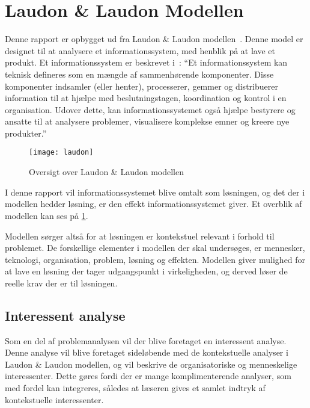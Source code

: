 \section{Laudon \& Laudon Modellen}
Denne rapport er opbygget ud fra Laudon \& Laudon modellen~\cite{laudon}. Denne model er designet til at analysere et informationssystem, med henblik på at lave et produkt. Et informationssystem er beskrevet i~\cite{laudon2006management}: \enquote{Et informationssystem kan teknisk defineres som en mængde af sammenhørende komponenter. Disse komponenter indsamler (eller henter), processerer, gemmer og distribuerer information til at hjælpe med beslutningstagen, koordination og kontrol i en organisation. Udover dette, kan informationssystemet også hjælpe bestyrere og ansatte til at analysere problemer, visualisere komplekse emner og kreere nye produkter.}

\begin{figure}
  \centering
  \texttt{[image: laudon]}
	\caption{Oversigt over Laudon \& Laudon modellen}
	\label{fig:oversigt_laudon}
\end{figure}

I denne rapport vil informationssystemet blive omtalt som løsningen, og det der i modellen hedder løsning, er den effekt informationssystemet giver. Et overblik af modellen kan ses på \cref{fig:oversigt_laudon}. 

Modellen sørger altså for at løsningen er kontekstuel relevant i forhold til problemet. De forskellige elementer i modellen der skal undersøges, er mennesker, teknologi, organisation, problem, løsning og effekten. Modellen giver mulighed for at lave en løsning der tager udgangspunkt i virkeligheden, og derved løser de reelle krav der er til løsningen.

\subsection{Interessent analyse}

Som en del af problemanalysen vil der blive foretaget en interessent analyse. Denne analyse vil blive foretaget sideløbende med de kontekstuelle analyser i Laudon \& Laudon modellen, og vil beskrive de organisatoriske og menneskelige interessenter. Dette gøres fordi der er mange komplimenterende analyser, som med fordel kan integreres, således at læseren gives et samlet indtryk af kontekstuelle interessenter. 
